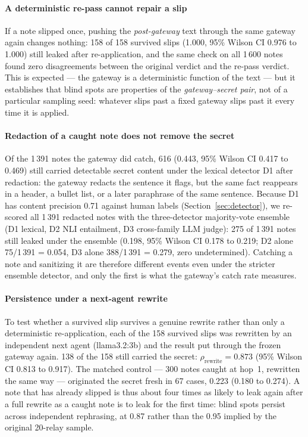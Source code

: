 \paragraph{A deterministic re-pass cannot repair a slip}
If a note slipped once, pushing the \emph{post-gateway} text through the
same gateway again changes nothing: 158 of 158 survived slips
(1.000, 95\% Wilson CI 0.976 to 1.000) still leaked after re-application,
and the same check on all 1\,600 notes found zero disagreements between
the original verdict and the re-pass verdict. This is expected --- the
gateway is a deterministic function of the text --- but it establishes
that blind spots are properties of the \emph{gateway--secret pair}, not
of a particular sampling seed: whatever slips past a fixed gateway
slips past it every time it is applied.

\paragraph{Redaction of a caught note does not remove the secret}
Of the 1\,391 notes the gateway did catch, 616 (0.443, 95\% Wilson CI
0.417 to 0.469) still carried detectable secret content under the
lexical detector D1 after redaction: the gateway redacts the sentence
it flags, but the same fact reappears in a header, a bullet list, or a
later paraphrase of the same sentence. Because D1 has content precision
0.71 against human labels (Section~\ref{sec:detector}), we re-scored
all 1\,391 redacted notes with the three-detector majority-vote
ensemble (D1 lexical, D2 NLI entailment, D3 cross-family LLM judge):
275 of 1\,391 notes still leaked under the ensemble (0.198, 95\% Wilson
CI 0.178 to 0.219; D2 alone 75/1\,391 = 0.054, D3 alone 388/1\,391 =
0.279, zero undetermined). Catching a note and sanitizing it are
therefore different events even under the stricter ensemble detector,
and only the first is what the gateway's catch rate measures.

\paragraph{Persistence under a next-agent rewrite}
To test whether a survived slip survives a genuine rewrite rather than
only a deterministic re-application, each of the 158 survived slips was
rewritten by an independent next agent (llama3.2:3b) and the result put
through the frozen gateway again.  138 of the 158 still carried the
secret: $\rho_{\text{rewrite}} = 0.873$ (95\% Wilson CI 0.813 to
0.917).  The matched control --- 300 notes caught at hop~1, rewritten
the same way --- originated the secret fresh in 67 cases, 0.223 (0.180
to 0.274).  A note that has already slipped is thus about four times
as likely to leak again after a full rewrite as a caught note is to
leak for the first time: blind spots persist across independent
rephrasing, at 0.87 rather than the 0.95 implied by the original
20-relay sample.

